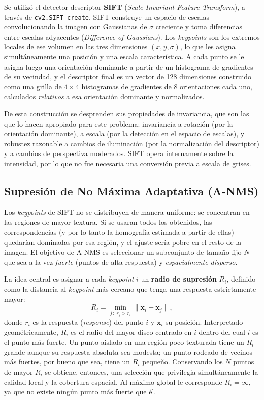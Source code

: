 \documentclass[conference]{IEEEtran}
\begin{document}
Se utilizó el detector-descriptor \textbf{SIFT} (\textit{Scale-Invariant Feature Transform}), a través de \texttt{cv2.SIFT\_create}. SIFT construye un espacio de escalas convolucionando la imagen con Gaussianas de $\sigma$ creciente y toma diferencias entre escalas adyacentes (\textit{Difference of Gaussians}). Los \textit{keypoints} son los extremos locales de ese volumen en las tres dimensiones $(x,y,\sigma)$, lo que les asigna simultáneamente una posición y una escala característica. A cada punto se le asigna luego una orientación dominante a partir de un histograma de gradientes de su vecindad, y el descriptor final es un vector de 128 dimensiones construido como una grilla de $4\times4$ histogramas de gradientes de 8 orientaciones cada uno, calculados \emph{relativos} a esa orientación dominante y normalizados.

De esta construcción se desprenden sus propiedades de invariancia, que son las que lo hacen apropiado para este problema: invariancia a rotación (por la orientación dominante), a escala (por la detección en el espacio de escalas), y robustez razonable a cambios de iluminación (por la normalización del descriptor) y a cambios de perspectiva moderados. SIFT opera internamente sobre la intensidad, por lo que no fue necesaria una conversión previa a escala de grises.

\subsection{Supresión de No Máxima Adaptativa (A-NMS)}
\label{sec:anms}

Los \textit{keypoints} de SIFT no se distribuyen de manera uniforme: se concentran en las regiones de mayor textura. Si se usaran todos los obtenidos, las correspondencias (y por lo tanto la homografía estimada a partir de ellas) quedarían dominadas por esa región, y el ajuste sería pobre en el resto de la imagen. El objetivo de A-NMS es seleccionar un subconjunto de tamaño fijo $N$ que sea a la vez \emph{fuerte} (puntos de alta respuesta) y \emph{espacialmente disperso}.

La idea central es asignar a cada \textit{keypoint} $i$ un \textbf{radio de supresión} $R_i$, definido como la distancia al \textit{keypoint} más cercano que tenga una respuesta estrictamente mayor:
\begin{equation}
R_i = \min_{j\,:\;r_j > r_i} \lVert \mathbf{x}_i - \mathbf{x}_j \rVert ,
\label{eq:anms}
\end{equation}
donde $r_i$ es la respuesta (\textit{response}) del punto $i$ y $\mathbf{x}_i$ su posición. Interpretado geométricamente, $R_i$ es el radio del mayor disco centrado en $i$ dentro del cual $i$ es el punto más fuerte. Un punto aislado en una región poco texturada tiene un $R_i$ grande aunque su respuesta absoluta sea modesta; un punto rodeado de vecinos más fuertes, por bueno que sea, tiene un $R_i$ pequeño. Conservando los $N$ puntos de mayor $R_i$ se obtiene, entonces, una selección que privilegia simultáneamente la calidad local y la cobertura espacial. Al máximo global le corresponde $R_i = \infty$, ya que no existe ningún punto más fuerte que él.
\end{document}
